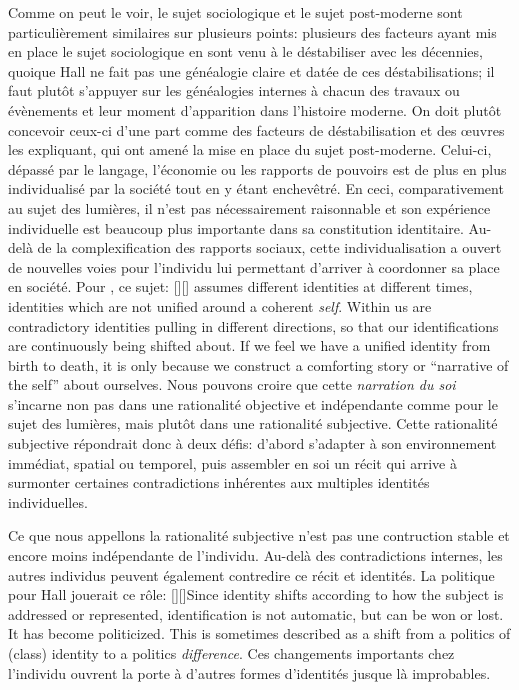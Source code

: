 Comme on peut le voir, le sujet sociologique et le sujet post-moderne sont particulièrement similaires sur plusieurs points: plusieurs des facteurs ayant mis en place le sujet sociologique en sont venu à le déstabiliser avec les décennies, quoique Hall ne fait pas une généalogie claire et datée de ces déstabilisations; il faut plutôt s'appuyer sur les généalogies internes à chacun des travaux ou évènements et leur moment d'apparition dans l'histoire moderne.
On doit plutôt concevoir ceux-ci d'une part comme des facteurs de déstabilisation et des œuvres les expliquant, qui ont amené la mise en place du sujet post-moderne. Celui-ci, dépassé par le langage, l'économie ou les rapports de pouvoirs est de plus en plus individualisé par la société tout en y étant enchevêtré. 
En ceci, comparativement au sujet des lumières, il n'est pas nécessairement raisonnable et son expérience individuelle est beaucoup plus importante dans sa constitution identitaire. Au-delà de la complexification des rapports sociaux, cette individualisation a ouvert de nouvelles voies pour l'individu lui permettant d'arriver à coordonner sa place en société. 
Pour \citeauthor{Hall1996a}, ce sujet: [{\citeyear[598]{Hall1996a}}][]{\textelp{} assumes different identities at different times, identities which are not unified around a coherent \emph{self}. Within us are contradictory identities pulling in different directions, so that our identifications are continuously being shifted about. If we feel we have a unified identity from birth to death, it is only because we construct a comforting story or ``narrative of the self'' about ourselves}. 
Nous pouvons croire que cette \emph{narration du soi} s'incarne non pas dans une rationalité objective et indépendante comme pour le sujet des lumières, mais plutôt dans une rationalité subjective. 
Cette rationalité subjective répondrait donc à deux défis: d'abord s'adapter à son environnement immédiat, spatial ou temporel, puis assembler en soi un récit qui arrive à surmonter certaines contradictions inhérentes aux multiples identités individuelles.

Ce que nous appellons la rationalité subjective n'est pas une contruction stable et encore moins indépendante de l'individu.
Au-delà des contradictions internes, les autres individus peuvent également contredire ce récit et identités.
La politique pour Hall jouerait ce rôle: [{\citeyear[610]{Hall1996a}}][]{Since identity shifts according to how the subject is addressed or represented, identification is not automatic, but can be won or lost. It has become politicized. This is sometimes described as a shift from a politics of (class) identity to a politics \emph{difference}}.
Ces changements importants chez l'individu ouvrent la porte à d'autres formes d'identités jusque là improbables.

